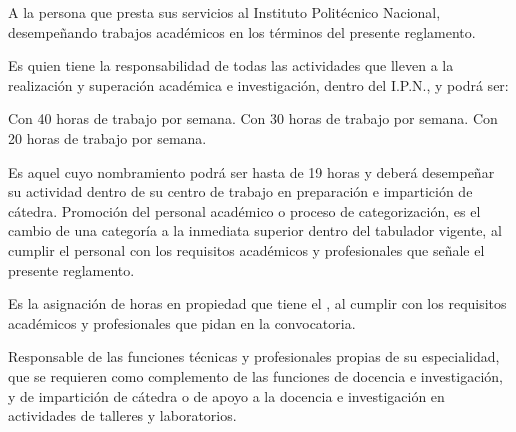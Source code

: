 \begin{bGlosario}
	
	
	 A la persona que presta sus servicios al Instituto Politécnico Nacional, desempeñando trabajos académicos en los términos del presente reglamento.
	
	 Es quien tiene la responsabilidad de todas las actividades que lleven a la realización y superación
	académica e investigación, dentro del I.P.N., y podrá ser:\\
		\begin{Titemize}
			 Con 40 horas de trabajo por semana.
			 Con 30 horas de trabajo por semana.
			 Con 20 horas de trabajo por semana.
		\end{Titemize}
	
	 Es aquel cuyo nombramiento podrá ser hasta de 19 horas y deberá desempeñar su actividad dentro de su centro de trabajo en preparación e impartición de cátedra.
	 Promoción del personal académico o proceso de categorización, es el cambio de una categoría a la inmediata superior dentro del tabulador vigente, al cumplir el personal con los requisitos académicos y profesionales que señale el presente reglamento.
	
	 Es la asignación de horas en propiedad que tiene el , al cumplir con los requisitos académicos y profesionales que pidan en la convocatoria.
	
	 Responsable de las funciones técnicas y profesionales propias de su especialidad, que se requieren como complemento de las funciones de docencia e investigación, y de impartición de cátedra o de apoyo a la docencia e investigación en actividades de talleres y laboratorios.
		

\end{bGlosario}
